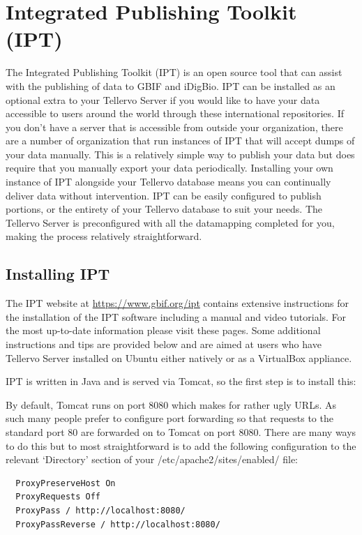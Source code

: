 \section{Integrated Publishing Toolkit (IPT)}
The Integrated Publishing Toolkit (IPT) is an open source tool that can assist with the publishing of data to GBIF and iDigBio.  IPT can be installed as an optional extra to your Tellervo Server if you would like to have your data accessible to users around the world through these international repositories.  If you don't have a server that is accessible from outside your organization, there are a number of organization that run instances of IPT that will accept dumps of your data manually. This is a relatively simple way to publish your data but does require that you manually export your data periodically.  Installing your own instance of IPT alongside your Tellervo database means you can continually deliver data without intervention.  IPT can be easily configured to publish portions, or the entirety of your Tellervo database to suit your needs.  The Tellervo Server is preconfigured with all the datamapping completed for you, making the process relatively straightforward.  

\subsection{Installing IPT}
The IPT website at \url{https://www.gbif.org/ipt} contains extensive instructions for the installation of the IPT software including a manual and video tutorials.  For the most up-to-date information please visit these pages.  Some additional instructions and tips are provided below and are aimed at users who have Tellervo Server installed on Ubuntu either natively or as a VirtualBox appliance.

IPT is written in Java and is served via Tomcat, so the first step is to install this:

By default, Tomcat runs on port 8080 which makes for rather ugly URLs.  As such many people prefer to configure port forwarding so that requests to the standard port 80 are forwarded on to Tomcat on port 8080.  There are many ways to do this but to most straightforward is to add the following configuration to the relevant `Directory' section of your /etc/apache2/sites/enabled/ file:

\begin{verbatim}
  ProxyPreserveHost On
  ProxyRequests Off
  ProxyPass / http://localhost:8080/
  ProxyPassReverse / http://localhost:8080/  
\end{verbatim}

